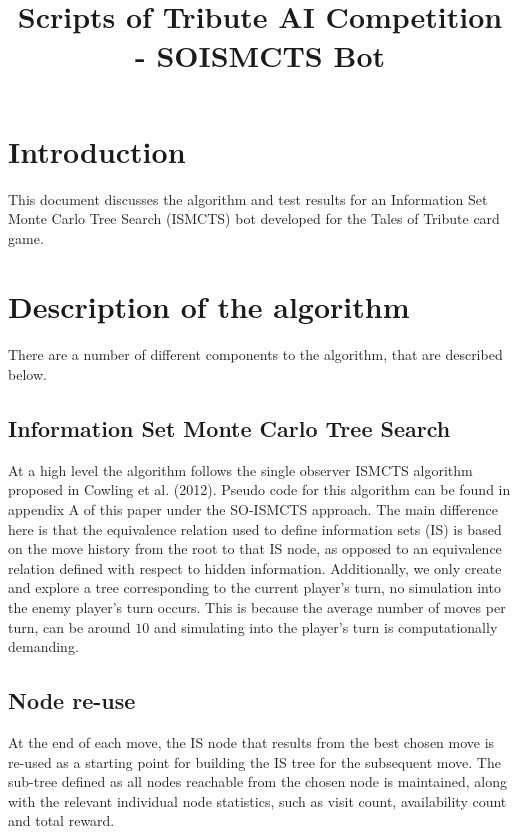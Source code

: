 \documentclass[a4paper,10pt]{article}
\begin{document}
\title{Scripts of Tribute AI Competition - SOISMCTS Bot}
\maketitle

\section{Introduction}
This document discusses the algorithm and test results for an Information Set Monte Carlo Tree Search (ISMCTS) bot developed for the Tales of Tribute card game.

\section{Description of the algorithm}
There are a number of different components to the algorithm, that are described below.

\subsection{Information Set Monte Carlo Tree Search}
At a high level the algorithm follows the single observer ISMCTS algorithm proposed in Cowling et al. (2012). Pseudo code for this algorithm can be found in appendix A of this paper under the SO-ISMCTS approach. The main difference here is that the equivalence relation used to define information sets (IS) is based on the move history from the root to that IS node, as opposed to an equivalence relation defined with respect to hidden information. Additionally, we only create and explore a tree corresponding to the current player's turn, no simulation into the enemy player's turn occurs. This is because the average number of moves per turn, can be around $10$ and simulating into the player's turn is computationally demanding.

\subsection{Node re-use}
At the end of each move, the IS node that results from the best chosen move is re-used as a starting point for building the IS tree for the subsequent move. The sub-tree defined as all nodes reachable from the chosen node is maintained, along with the relevant individual node statistics, such as visit count, availability count and total reward.
\end{document}
